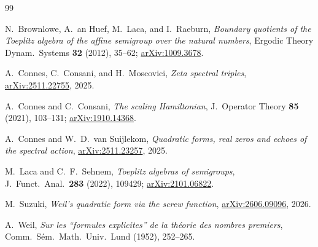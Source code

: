 \documentclass[11pt]{article}
\theoremstyle{definition}
\theoremstyle{remark}
\begin{document}
\begin{thebibliography}{99}

N.~Brownlowe, A.~an Huef, M.~Laca, and I.~Raeburn,
\emph{Boundary quotients of the Toeplitz algebra of the affine semigroup over the natural
numbers},
Ergodic Theory Dynam.\ Systems \textbf{32} (2012), 35--62;
\href{https://arxiv.org/abs/1009.3678}{arXiv:1009.3678}.

A.~Connes, C.~Consani, and H.~Moscovici,
\emph{Zeta spectral triples},
\href{https://arxiv.org/abs/2511.22755}{arXiv:2511.22755}, 2025.

A.~Connes and C.~Consani,
\emph{The scaling Hamiltonian},
J.\ Operator Theory \textbf{85} (2021), 103--131;
\href{https://arxiv.org/abs/1910.14368}{arXiv:1910.14368}.

A.~Connes and W.~D.~van Suijlekom,
\emph{Quadratic forms, real zeros and echoes of the spectral action},
\href{https://arxiv.org/abs/2511.23257}{arXiv:2511.23257}, 2025.

M.~Laca and C.~F.~Sehnem,
\emph{Toeplitz algebras of semigroups},
J.\ Funct.\ Anal.\ \textbf{283} (2022), 109429;
\href{https://arxiv.org/abs/2101.06822}{arXiv:2101.06822}.

M.~Suzuki,
\emph{Weil's quadratic form via the screw function},
\href{https://arxiv.org/abs/2606.09096}{arXiv:2606.09096}, 2026.

A.~Weil,
\emph{Sur les ``formules explicites'' de la th\'eorie des nombres premiers},
Comm.\ S\'em.\ Math.\ Univ.\ Lund (1952), 252--265.

\end{thebibliography}
\end{document}
